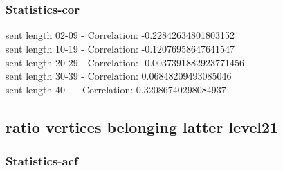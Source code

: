 \documentclass{article}%
\begin{document}
\begin{figure}[ht]%
\centering%
\setlength{\abovecaptionskip}{-35pt}%
%
%
\\%
%
%
\\%
%
\end{figure}

%
\newpage%
\subsubsection{Statistics{-}cor}%
\label{ssubsec:Statistics{-}cor}%
\noindent%
sent length 02-09 - Correlation: -0.22842634801803152\\%
sent length 10-19 - Correlation: -0.12076958647641547\\%
sent length 20-29 - Correlation: -0.0037391882923771456\\%
sent length 30-39 - Correlation: 0.06848209493085046\\%
sent length 40+ - Correlation: 0.32086740298084937\\

%
\newpage

%
\subsection{ratio vertices belonging latter level21}%
\label{subsec:ratioverticesbelonginglatterlevel21}%
\subsubsection{Statistics{-}acf}%
\label{ssubsec:Statistics{-}acf}%
\end{document}
